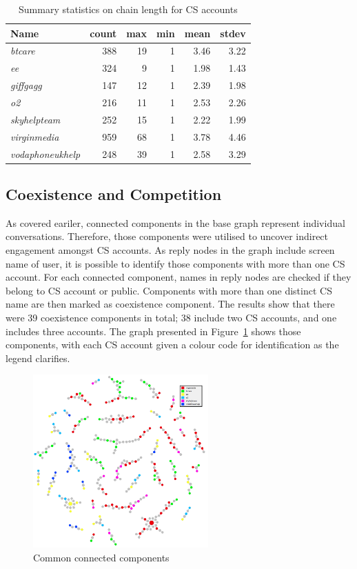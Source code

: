 \documentclass[sigconf]{acmart}
\begin{document}
\begin{table}[!h]
\centering
\begin{tabularx}{\columnwidth}{lrrrrr}
\toprule
\textbf{Name} & \textbf{count} & \textbf{max} & \textbf{min} & \textbf{mean} & \textbf{stdev}\\ 
\midrule
{\emph{btcare}} & 388 & 19 & 1 & 3.46 & 3.22\\
{\emph{ee}} & 324 & 9 & 1 & 1.98 & 1.43\\
{\emph{giffgagg}} & 147 & 12 & 1 & 2.39 & 1.98\\ 
{\emph{o2}} & 216 & 11 & 1 & 2.53 & 2.26\\
{\emph{skyhelpteam}} & 252 & 15 & 1 & 2.22 & 1.99\\
{\emph{virginmedia}} & 959 & 68 & 1 & 3.78 & 4.46\\
{\emph{vodaphoneukhelp}} & 248 & 39 & 1 & 2.58 & 3.29\\
\bottomrule
\end{tabularx}
\caption{Summary statistics on chain length for CS accounts}
\label{tbl:delaystatscl}
\end{table}

\subsection{Coexistence and Competition}

As covered eariler, connected components in the base graph represent 
individual conversations. Therefore, those components were utilised to uncover 
indirect engagement amongst CS accounts. As reply nodes in the graph include 
screen name of user, it is possible to identify those components with 
more than one CS account. For each connected component, names in reply nodes
are checked if they belong to CS account or public. Components with more than
one distinct CS name are then marked as coexistence component. The results show
that there were 39 coexistence components in total; 38 include two CS accounts, and one
includes three accounts. The graph presented in
Figure~\ref{fig:commoncc} shows those components, with each CS account
given a colour code for identification as the legend clarifies.

\begin{figure}[htb]
\centering
\includegraphics[width=0.6\textwidth]{images/commoncc.png}
\caption{Common connected components}
\label{fig:commoncc}
\end{figure}
\end{document}
